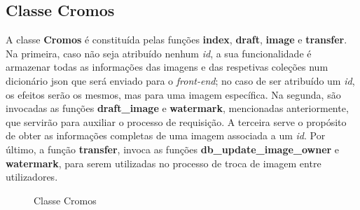 \documentclass{report}
\begin{document}
\subsection{Classe Cromos}
\label{ssec.classecromos}

A classe \textbf{Cromos} é constituída pelas funções \textbf{index}, \textbf{draft}, \textbf{image} e \textbf{transfer}. Na primeira, caso não seja atribuído nenhum \textit{id}, a sua funcionalidade é armazenar todas as informações das imagens e das respetivas coleções num dicionário \ac{json} que será enviado para o \textit{front-end}; no caso de ser atribuído um \textit{id}, os efeitos serão os mesmos, mas para uma imagem específica. Na segunda, são invocadas as funções \textbf{draft\_image} e \textbf{watermark}, mencionadas anteriormente, que servirão para auxiliar o processo de requisição. A terceira serve o propósito de obter as informações completas de uma imagem associada a um \textit{id}. Por último, a função \textbf{transfer}, invoca as funções \textbf{db\_update\_image\_owner} e \textbf{watermark}, para serem utilizadas no processo de troca de imagem entre utilizadores.

\begin{figure}[H]%
    \centering
    \qquad
    \caption{Classe Cromos}%
    \label{fig:classecromos}%
\end{figure}
\end{document}
